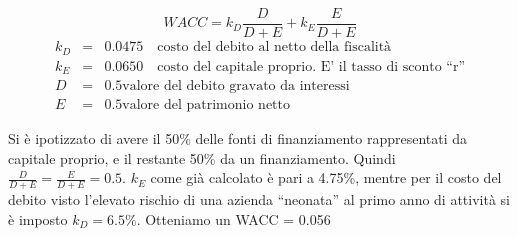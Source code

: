 \begin{displaymath}
WACC = k_D \frac{D}{D+E} + k_E \frac{E}{D+E}
\end{displaymath}
\begin{eqnarray*}
k_D &=& 0.0475 \quad \mbox{costo del debito al netto della fiscalità} \\
k_E &=& 0.0650 \quad \mbox{costo del capitale proprio. E’ il tasso di sconto “r”} \\
D &=& 0.5 \mbox{valore del debito gravato da interessi} \\
E &=& 0.5 \mbox{valore del patrimonio netto} 
\end{eqnarray*}

Si è ipotizzato di avere il 50\% delle fonti di finanziamento rappresentati da
capitale proprio, e il restante 50\% da un finanziamento. Quindi $\frac{D}{D+E} 
= \frac{E}{D+E} = 0.5$.  $k_E$ come già calcolato è pari a 4.75\%, mentre per il
costo del debito visto l’elevato rischio di una azienda “neonata” al primo anno
di attività si è imposto $k_D = 6.5\%$. 
Otteniamo un WACC = 0.056
